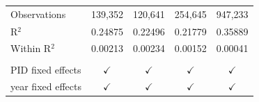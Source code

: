 \begin{tabular}{lcccc}
   Observations        & 139,352        & 120,641        & 254,645                & 947,233\\  
   R$^2$               & 0.24875        & 0.22496        & 0.21779                & 0.35889\\  
   Within R$^2$        & 0.00213        & 0.00234        & 0.00152                & 0.00041\\  
    \\
   PID fixed effects   & $\checkmark$   & $\checkmark$   & $\checkmark$           & $\checkmark$\\   
   year fixed effects  & $\checkmark$   & $\checkmark$   & $\checkmark$           & $\checkmark$\\   
   \bottomrule
\end{tabular}
\par\endgroup


